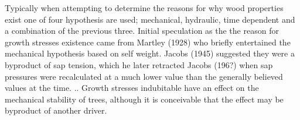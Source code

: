 Typically when attempting to determine the reasons for why wood properties exist
one of four hypothesis are used; mechanical, hydraulic, time dependent and a
combination of the previous three. Initial speculation as the the reason for
growth stresses existence came from Martley (1928) who briefly entertained the
mechanical hypothesis based on self weight. Jacobs (1945) suggested they were a
byproduct of sap tension, which he later retracted Jacobs (196?) when sap
pressures were recalculated at a much lower value than the generally believed
values at the time. .. Growth stresses indubitable have an effect on the
mechanical stability of trees, although it is conceivable that the effect may be
byproduct of another driver.